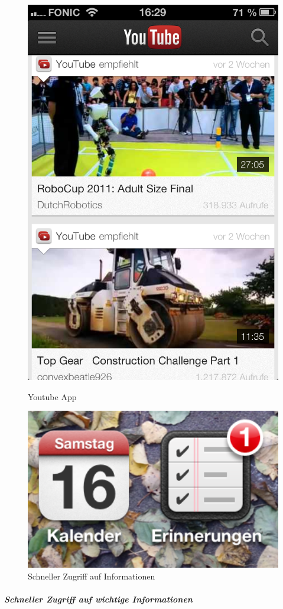 \begin{figure}[!htb]
  \includegraphics[width=1\textwidth]{img/youtube.png}
  \caption{Youtube App}\label{fig:youtube}
\endminipage\hfill
{}
  \includegraphics[width=1\textwidth]{img/iconIos.png}
	\caption{Schneller Zugriff auf Informationen}\label{fig:iconIos}
\endminipage
\end{figure}
\subparagraph{Schneller Zugriff auf wichtige Informationen} 
\label{subp:subparagraph_name}

